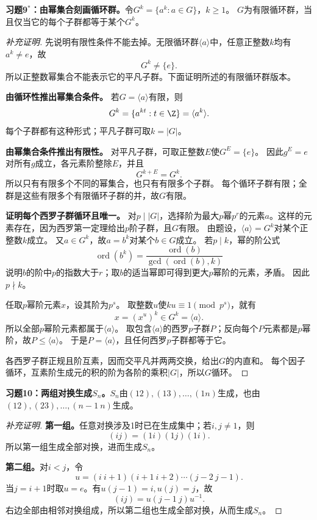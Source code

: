 \begin{problem}
\textbf{习题9$^*$：由幂集合刻画循环群。}令$G^k=\{a^k:a\in G\}$，$k\geq1$。
$G$为有限循环群，当且仅当它的每个子群都等于某个$G^k$。
\end{problem}
\begin{proof}[补充证明]
先说明有限性条件不能去掉。无限循环群$\langle a\rangle$中，任意正整数$k$均有$a^k\neq e$，故
\[
G^k\neq\{e\}.
\]
所以正整数幂集合不能表示它的平凡子群。下面证明所述的有限循环群版本。

\textbf{由循环性推出幂集合条件。}
若$G=\langle a\rangle$有限，则
\[
G^k=\{a^{kt}:t\in\Z\}=\langle a^k\rangle.
\]
每个子群都有这种形式；平凡子群可取$k=|G|$。

\textbf{由幂集合条件推出有限性。}
对平凡子群，可取正整数$E$使$G^E=\{e\}$。
因此$g^E=e$对所有$g$成立，各元素阶整除$E$，并且
\[
G^{k+E}=G^k.
\]
所以只有有限多个不同的幂集合，也只有有限多个子群。
每个循环子群有限；全群是这些有限多个有限循环子群的并，故$G$有限。

\textbf{证明每个西罗子群循环且唯一。}
对$p\mid|G|$，选择阶为最大$p$幂$p^r$的元素$a$。这样的元素存在，因为西罗第一定理给出$p$阶子群，且$G$有限。
由题设，$\langle a\rangle=G^k$对某个正整数$k$成立。
又$a\in G^k$，故$a=b^k$对某个$b\in G$成立。
若$p\mid k$，幂的阶公式
\[
\operatorname{ord}(b^k)
=\frac{\operatorname{ord}(b)}{\gcd(\operatorname{ord}(b),k)}
\]
说明$b$的阶中$p$的指数大于$r$；取$b$的适当幂即可得到更大$p$幂阶的元素，矛盾。
因此$p\nmid k$。

任取$p$幂阶元素$x$，设其阶为$p^s$。
取整数$u$使$ku\equiv1\pmod{p^s}$，就有
\[
x=(x^u)^k\in G^k=\langle a\rangle.
\]
所以全部$p$幂阶元素都属于$\langle a\rangle$。
取包含$\langle a\rangle$的西罗$p$子群$P$；反向每个$P$元素都是$p$幂阶，故$P\leq\langle a\rangle$。
于是$P=\langle a\rangle$，且任何西罗$p$子群都等于它。

各西罗子群正规且阶互素，因而交平凡并两两交换，给出$G$的内直和。
每个因子循环，互素阶生成元的积的阶为各阶的乘积$|G|$，所以$G$循环。
\end{proof}

\begin{problem}
\textbf{习题10：两组对换生成$S_n$。}$S_n$由$(12),(13),\ldots,(1n)$生成，也由$(12),(23),\ldots,(n-1\ n)$生成。
\end{problem}
\begin{proof}[补充证明]
\textbf{第一组。}任意对换涉及1时已在生成集中；若$i,j\neq1$，则
\[
(ij)=(1i)(1j)(1i).
\]
所以第一组生成全部对换，进而生成$S_n$。

\textbf{第二组。}对$i<j$，令
\[
u=(i\ i+1)(i+1\ i+2)\cdots(j-2\ j-1).
\]
当$j=i+1$时取$u=e$。有$u(j-1)=i,u(j)=j$，故
\[
(ij)=u(j-1\ j)u^{-1}.
\]
右边全部由相邻对换组成，所以第二组也生成全部对换，从而生成$S_n$。
\end{proof}

